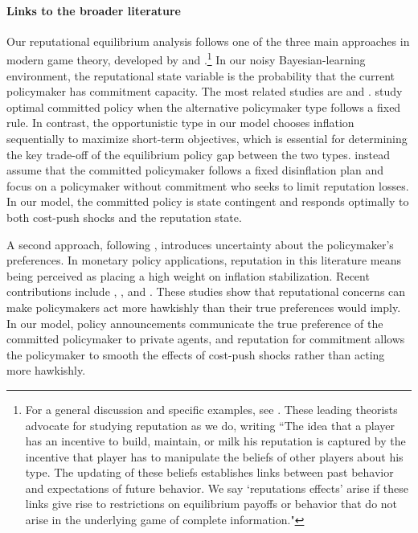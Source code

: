 \documentclass[12pt,letter,leqno]{article}
\theoremstyle{asn}
\theoremstyle{lem}
\theoremstyle{slem}
\theoremstyle{prop}
\theoremstyle{appprop}
\theoremstyle{rem}
\theoremstyle{defn}
\begin{document}
\paragraph{Links to the broader literature} Our reputational equilibrium
analysis follows one of the three main approaches in modern game theory, developed
by \cite{milgrom_limit_1982} and \cite{kreps_reputation_1982}.\footnote{For a
general discussion and specific examples, see \cite{mailath_repeated_2006}.
These leading theorists advocate for studying reputation as we do, writing ``The
idea that a player has an incentive to build, maintain, or milk his reputation
is captured by the incentive that player has to manipulate the beliefs of other
players about his type. The updating of these beliefs establishes links between
past behavior and expectations of future behavior. We say `reputations effects'
arise if these links give rise to restrictions on equilibrium payoffs or
behavior that do not arise in the underlying game of complete information."} In
our noisy Bayesian-learning environment, the reputational state variable is the
probability that the current policymaker has commitment capacity. The most
related studies are \cite{lu_optimal_2016} and
\cite{kostadinov_reputation_2025}. \cite{lu_optimal_2016} study optimal
committed policy when the alternative policymaker type follows a fixed rule. In
contrast, the opportunistic type in our model chooses inflation sequentially to
maximize short-term objectives, which is essential for determining the
key trade-off of the equilibrium policy gap between the two types. 
 \cite{kostadinov_reputation_2025}
instead assume that the committed policymaker follows a fixed disinflation plan
and focus on a policymaker without commitment who seeks to limit reputation
losses. In our model, the committed policy is state contingent and
responds optimally to both cost-push shocks and the reputation state. 

A second approach, following \cite{backus_inflation_1985},
introduces uncertainty about the policymaker's preferences. In monetary policy
applications, reputation in this literature means being perceived as placing a
high weight on inflation stabilization. Recent contributions include
\cite{caravello_reassessing_2025}, \cite{amador_central_2026}, and
\cite{bocola_monetary_2026}. These studies show that reputational concerns can
make policymakers act more hawkishly than their true preferences would imply.
In our model, policy announcements communicate the true preference of the
committed policymaker to private agents, and reputation for commitment allows
the policymaker to smooth the effects of cost-push shocks rather than acting
more hawkishly. 
 
\end{document}
